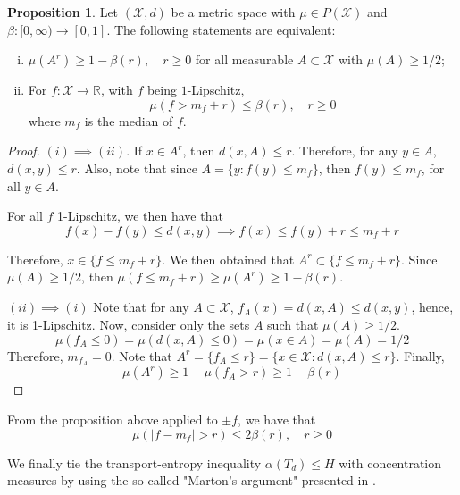 \documentclass[10pt]{article}
\theoremstyle{definition}
\newtheorem{proposition}{Proposition}
\begin{document}
\begin{proposition}
	Let $(\mathcal X, d)$ be a metric space with $\mu \in P(\mathcal X)$ and
	$\beta: [0, \infty) \rightarrow [0,1]$. The following statements are equivalent:
	\begin{enumerate}[(i)]
		\item 
		$
		\mu(A^r) \geq 1 - \beta(r), \quad r \geq 0
		$ for all measurable $A \subset \mathcal X$ with $\mu(A) \geq 1/2$;
		\item For $f:\mathcal X \rightarrow \mathbb R$, with $f$ being $1$-Lipschitz,
		$$
		\mu(f > m_f + r) \leq \beta(r), \quad r \geq 0
		$$
		where $m_f$ is the median of $f$.
	\end{enumerate}
\begin{proof}
	$(i) \implies (ii)$. If $x \in A^r$, then $d(x,A) \leq r$. Therefore, for any
	$y \in A$, $d(x,y) \leq r$. Also, note that since $A = \{y: f(y) \leq m_f\}$,
	then $f(y) \leq m_f$, for all $y \in A$.

	For all $f$ 1-Lipschitz, we then have that
	$$
	f(x) - f(y) \leq d(x,y) \implies f(x) \leq f(y) + r \leq m_f + r
	$$

	Therefore, $x \in \{f \leq m_f + r\}$. We then obtained that
	$A^r \subset \{ f \leq m_f + r\}$. Since $\mu(A) \geq 1/2$, then
	$\mu(f \leq m_f + r) \geq \mu(A^r) \geq 1 - \beta(r)$.
	
	$(ii) \implies (i)$ Note that for any $A \subset \mathcal X$, $f_A(x) = d(x,A) \leq
	d(x,y)$, hence, it is 1-Lipschitz. Now, consider only the sets $A$ such that
	$\mu(A) \geq 1/2$.
	$$
	\mu(f_A \leq 0) = \mu(d(x,A) \leq 0) = \mu(x \in A) = \mu(A) = 1/2
	$$
	Therefore, $m_{f_A} = 0$. Note that
	$A^r = \{ f_A \leq r\} = \{x \in \mathcal X: d(x,A) \leq r\}$. Finally,
	$$\mu(A^r) \geq 1 - \mu(f_A > r) \geq 1 - \beta(r)$$

\end{proof}
\end{proposition}

From the proposition above applied to $\pm f$, we have that
\begin{equation}
	\mu(\mid f - m_f \mid > r) \leq 2\beta(r), \quad r\geq 0
\end{equation}

We finally tie the transport-entropy inequality $\alpha(T_d) \leq H$ with
concentration measures by using the so called "Marton's argument" presented in
\cite{marton1986simple}.
\end{document}
